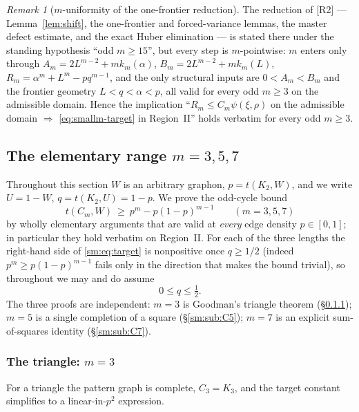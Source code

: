 \documentclass[11pt]{article}
\theoremstyle{remark}
\newtheorem{remark}[theorem]{Remark}
\theoremstyle{plain}
\theoremstyle{plain}
\begin{document}
\begin{remark}[$m$-uniformity of the one-frontier reduction]\label{rem:muniform-91113}
The reduction of [R2] --- Lemma~\ref{lem:shift}, the one-frontier and
forced-variance lemmas, the master defect estimate, and the exact Huber
elimination --- is stated there under the standing hypothesis ``odd $m\ge15$'',
but every step is $m$-pointwise: $m$ enters only through $A_m=2L^{m-2}+mk_m(\alpha)$,
$B_m=2L^{m-2}+mk_m(L)$, $R_m=\alpha^m+L^m-pq^{m-1}$, and the only structural
inputs are $0<A_m<B_m$ and the frontier geometry $L<q<\alpha<p$, all valid for
every odd $m\ge3$ on the admissible domain.  Hence the implication ``$R_m\le
C_m\psi(\xi,\rho)$ on the admissible domain $\Rightarrow$ \eqref{eq:smallm-target}
in Region~II'' holds verbatim for every odd $m\ge3$.
\end{remark}

\subsection{The elementary range \texorpdfstring{$m=3,5,7$}{m=3,5,7}}\label{sec:smallm-elem}

Throughout this section $W$ is an arbitrary graphon, $p=t(K_2,W)$, and we
write $U=1-W$, $q=t(K_2,U)=1-p$.  We prove the odd-cycle bound
\begin{equation}\label{sm:eq:target}
        t(C_m,W)\ \ge\ p^{m}-p(1-p)^{m-1}
        \qquad(m=3,5,7)
\end{equation}
by wholly elementary arguments that are valid at \emph{every} edge density
$p\in[0,1]$; in particular they hold verbatim on Region~II.  For each of the
three lengths the right-hand side of \eqref{sm:eq:target} is nonpositive once
$q\ge 1/2$ (indeed $p^m\ge p(1-p)^{m-1}$ fails only in the direction that makes
the bound trivial), so throughout we may and do assume
\[
        0\le q\le \tfrac12 .
\]
The three proofs are independent: $m=3$ is Goodman's triangle theorem
(\S\ref{sm:sub:C3}); $m=5$ is a single completion of a square
(\S\ref{sm:sub:C5}); $m=7$ is an explicit sum-of-squares identity
(\S\ref{sm:sub:C7}).

\subsubsection{The triangle: \texorpdfstring{$m=3$}{m=3}}\label{sm:sub:C3}

For a triangle the pattern graph is complete, $C_3=K_3$, and the target
constant simplifies to a linear-in-$p^2$ expression.
\end{document}
